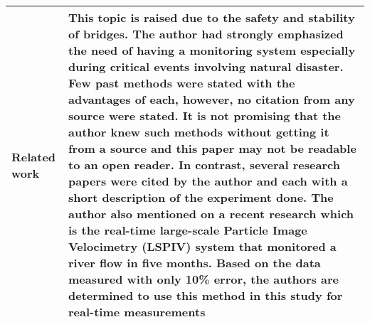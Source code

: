 \documentclass[10pt,a4paper,openany]{report}
\begin{document}
{\begin{tabular}{ |p{2.2cm}| p{13cm}| }
\hline
\multirow{2}{*}{Related work}  & This topic is raised due to the safety and stability of bridges. The author had strongly emphasized the need of having a monitoring system especially during critical events involving natural disaster.  Few past methods were stated with the advantages of each, however, no citation from any source were stated. It is not promising that the author knew such methods without getting it from a source and this paper may not be readable to an open reader. In contrast, several research papers were cited by the author and each with a short description of the experiment done. The author also mentioned on a recent research which is the real-time large-scale Particle Image Velocimetry (LSPIV) system that monitored a river flow in five months. Based on the data measured with only 10\% error, the authors are determined to use this method in this study for real-time measurements 
\\
\hline
\end{tabular}
\hspace*{-2cm}

}
\end{document}
